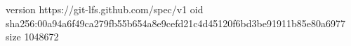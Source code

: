 version https://git-lfs.github.com/spec/v1
oid sha256:00a94a6f49ca279fb55b654a8e9cefd21c4d45120f6bd3be91911b85e80a6977
size 1048672
